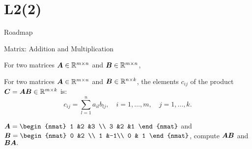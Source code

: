 \documentclass[fleqn,aspectratio=169]{beamer}
\begin{document}
\section{L2(2)}
\begin{frame}{Roadmap}

\plitemsep 0.1in

\bce[(1)] 
\item {}

\item {}

\item {}
\ece
\end{frame}

\begin{frame}{Matrix: Addition and Multiplication}

\plitemsep 0.1in

\bci 
\item For two matrices $\bm{A} \in {\mathbb R}^{m \times n}$ and $\bm{B} \in {\mathbb R}^{m \times n}$, 

\item For two matrices $\bm{A} \in {\mathbb R}^{m \times n}$ and $\bm{B} \in {\mathbb R}^{n \times k}$, 
the elements $c_{ij}$ of the product $\bm{C} = \bm{A}\bm{B} \in {\mathbb R}^{m \times k}$ is:
$$
c_{ij} = \sum_{l=1}^n a_{il} b_{lj}, \quad i = 1, \ldots, m, \quad j = 1, \ldots, k.
$$

\item \exam 
$\mat{A} = 
\begin{nmat} 
 1 &2 &3 \\
 3  &2  &1
\end{nmat}
$ and 
$\mat{B} = 
\begin{nmat} 
 0 &2 \\
 1  &-1\\
 0  & 1
\end{nmat}
$, compute $\bm{AB}$ and $\bm{BA}.$
\eci
\end{frame}
\end{document}
